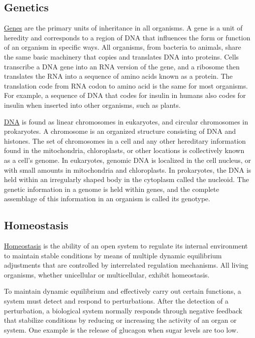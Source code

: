 \hypertarget{genetics}{%
\subsection{Genetics}\label{genetics}}

\href{https://en.wikipedia.org/wiki/Gene}{Genes} are the primary units of inheritance in all organisms. A gene is a unit of heredity and corresponds to a region of DNA that influences the form or function of an organism in specific ways. All organisms, from bacteria to animals, share the same basic machinery that copies and translates DNA into proteins. Cells transcribe a DNA gene into an RNA version of the gene, and a ribosome then translates the RNA into a sequence of amino acids known as a protein. The translation code from RNA codon to amino acid is the same for most organisms. For example, a sequence of DNA that codes for insulin in humans also codes for insulin when inserted into other organisms, such as plants.

\href{https://en.wikipedia.org/wiki/DNA}{DNA} is found as linear chromosomes in eukaryotes, and circular chromosomes in prokaryotes. A chromosome is an organized structure consisting of DNA and histones. The set of chromosomes in a cell and any other hereditary information found in the mitochondria, chloroplasts, or other locations is collectively known as a cell's genome. In eukaryotes, genomic DNA is localized in the cell nucleus, or with small amounts in mitochondria and chloroplasts. In prokaryotes, the DNA is held within an irregularly shaped body in the cytoplasm called the nucleoid. The genetic information in a genome is held within genes, and the complete assemblage of this information in an organism is called its genotype.

\hypertarget{homeostasis}{%
\subsection{Homeostasis}\label{homeostasis}}

\href{https://en.wikipedia.org/wiki/Homeostasis}{Homeostasis} is the ability of an open system to regulate its internal environment to maintain stable conditions by means of multiple dynamic equilibrium adjustments that are controlled by interrelated regulation mechanisms. All living organisms, whether unicellular or multicellular, exhibit homeostasis.

To maintain dynamic equilibrium and effectively carry out certain functions, a system must detect and respond to perturbations. After the detection of a perturbation, a biological system normally responds through negative feedback that stabilize conditions by reducing or increasing the activity of an organ or system. One example is the release of glucagon when sugar levels are too low.

